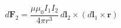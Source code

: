 \[ d\boldsymbol{F}_2 = \frac{\mu \mu_0 I_1 I_2}{4 \pi r^3} \, d\boldsymbol{l}_2 \times \left( d\boldsymbol{l}_1 \times \boldsymbol{r} \right) \]
